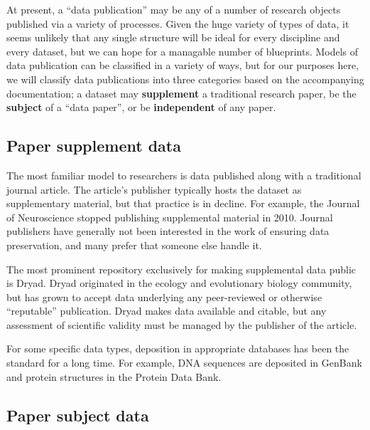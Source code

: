 \documentclass[10pt,a4paper,twocolumn]{article}
\begin{document}
At present, a ``data publication'' may be any of a number of research objects published via a variety of processes.
Given the huge variety of types of data, it seems unlikely that any single structure will be ideal for every discipline and every dataset, but we can hope for a managable number of blueprints. 
Models of data publication can be classified in a variety of ways, but for our purposes here, we will classify data publications into three categories based on the accompanying documentation; a dataset may \textbf{supplement} a traditional research paper, be the \textbf{subject} of a ``data paper'', or be \textbf{independent} of any paper.

\subsection*{Paper supplement data}\label{paper-supplement-data}

The most familiar model to researchers is data published along with a traditional journal article. 
The article's publisher typically hosts the dataset as supplementary material, but that practice is in decline.
For example, the Journal of Neuroscience stopped publishing supplemental material in 2010\cite{maunsell_announcement_2010}. 
Journal publishers have generally not been interested in the work of ensuring data preservation, and many prefer that someone else handle it.

The most prominent repository exclusively for making supplemental data public is Dryad\cite{dryad}.
Dryad originated in the ecology and evolutionary biology community, but has grown to accept data underlying any peer-reviewed or otherwise ``reputable'' publication. Dryad makes data available and citable, but any assessment of scientific validity must be managed by the publisher of the article. 

For some specific data types, deposition in appropriate databases has been the standard for a long time. 
For example, DNA sequences are deposited in GenBank\cite{genbank} and protein structures in the Protein Data Bank\cite{protein_data_bank}.


\subsection*{Paper subject data}\label{paper-subject-data}
\end{document}

